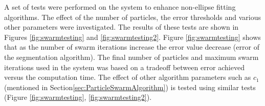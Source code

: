 \documentclass[preprint,10pt,5p,twocolumn]{elsarticle}
\begin{document}
\begin{table}
\begin{center}
\caption[Datasets Comparisons]{Table compares between datasets used in experiments in terms of number of samples, number of samples per category, etc...} 
\label{tab:datasets}

\end{center}
\end{table}

A set of tests were performed on the system to enhance non-ellipse fitting algorithms. The effect of the number of particles, the error thresholds and various other parameters were investigated. The results of these tests are shown in Figures \ref{fig:swarmtesting} and   \ref{fig:swarmtesting2}. Figure \ref{fig:swarmtesting} shows that as the number of swarm iterations increase the error value decrease (error of the segmentation algorithm). The final number of particles and maximum swarm iterations used in the system was based on a tradeoff between error achieved versus the computation time. The effect of other algorithm parameters such as $c_1$ (mentioned in Section\ref{sec:ParticleSwarmAlgorithm}) is tested using similar tests (Figure \ref{fig:swarmtesting}, \ref{fig:swarmtesting2}).%
    
\end{document}
